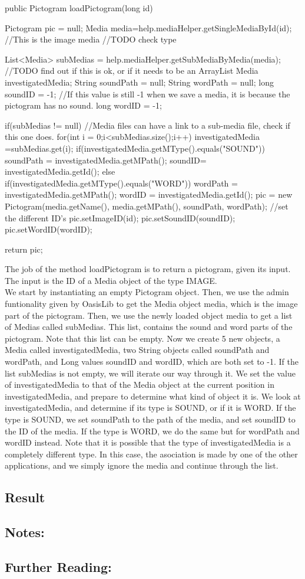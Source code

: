 \begin{source}{}
	public Pictogram loadPictogram(long id)
	{
		Pictogram pic = null;
		Media media=help.mediaHelper.getSingleMediaById(id); //This is the image media //TODO check type

		List<Media> subMedias =	help.mediaHelper.getSubMediaByMedia(media); //TODO find out if this is ok, or if it needs to be an ArrayList
		Media investigatedMedia;
		String soundPath = null;
		String wordPath = null;
		long soundID = -1; //If this value is still -1 when we save a media, it is because the pictogram has no sound.
		long wordID = -1;

		if(subMedias != null)	//Media files can have a link to a sub-media file, check if this one does.
		{
			for(int i = 0;i<subMedias.size();i++) 		
			{
				investigatedMedia =subMedias.get(i);
				if(investigatedMedia.getMType().equals("SOUND"))
				{
					soundPath = investigatedMedia.getMPath();
					soundID= investigatedMedia.getId();
				}
				else if(investigatedMedia.getMType().equals("WORD"))
				{
					wordPath = investigatedMedia.getMPath();
					wordID = investigatedMedia.getId();
				}
			}
		}
		pic = new Pictogram(media.getName(), media.getMPath(), soundPath, wordPath);
		//set the different ID's
		pic.setImageID(id);
		pic.setSoundID(soundID);
		pic.setWordID(wordID);

		return pic;
	}

\end{source}
The job of the method loadPictogram is to return a pictogram, given its input. The input is the ID of a Media object of the type IMAGE.\\
We start by instantiating an empty Pictogram object.
Then, we use the admin funtionality given by OasisLib to get the Media object media, which is the image part of the pictogram.
Then, we use the newly loaded object media to get a list of Medias called subMedias.
This list, contains the sound and word parts of the pictogram.
Note that this list can be empty.
Now we create 5 new objects, a Media called investigatedMedia, two String objects called soundPath and wordPath, and Long values soundID and wordID, which are both set to -1.
If the list subMedias is not empty, we will iterate our way through it.
We set the value of investigatedMedia to that of the Media object at the current position in investigatedMedia, and prepare to determine what kind of object it is.
We look at investigatedMedia, and determine if its type is SOUND, or if it is WORD.
If the type is SOUND, we set soundPath to the path of the media, and set soundID to the ID of the media.
If the type is WORD, we do the same but for wordPath and wordID instead.
Note that it is possible that the type of investigatedMedia is a completely different type. In this case, the asociation is made by one of the other applications, and we simply ignore the media and continue through the list.


\subsection{Result}


\subsection{Notes:}


\subsection{Further Reading:}